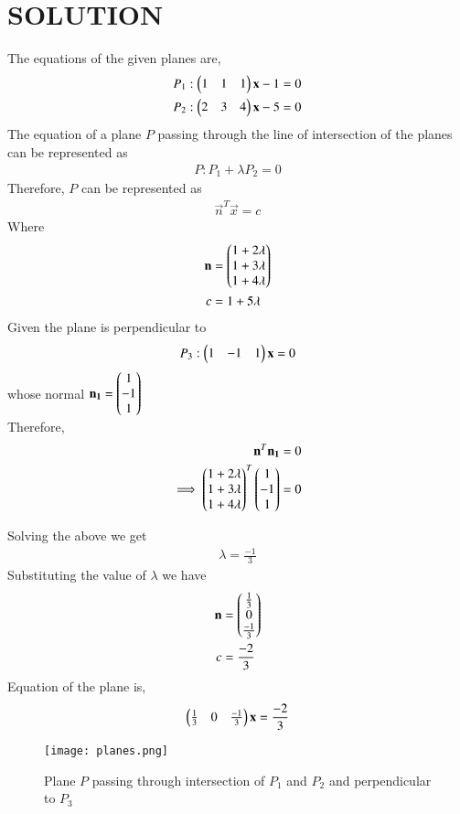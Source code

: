 \documentclass[journal,12pt,twocolumn]{IEEEtran}
\begin{document}
\section{SOLUTION}
The equations of the given planes are, 
\begin{align}
    P_{1} : \begin{pmatrix}1&1&1\end{pmatrix}\mathbf{x} - 1 = 0\\
    P_{2} : \begin{pmatrix}2&3&4\end{pmatrix}\mathbf{x} - 5 = 0
\end{align}
%
The equation of a plane $P$ passing through the line of intersection of the planes can be represented as
\begin{align}
   P : P_{1} + \lambda P_{2} = 0
\end{align}
%
Therefore, $P$ can be represented as
\begin{align}
    \vec{n}^T\vec{x}=c
\end{align}
Where
\begin{align}
    \mathbf{n}&=\begin{pmatrix}1+2\lambda\\1+3\lambda\\1+4\lambda\end{pmatrix}\\
    c&=1+5\lambda
\end{align}
Given the plane is perpendicular to
\begin{align}
    P_{3} : \begin{pmatrix}1&-1&1\end{pmatrix}\mathbf{x} = 0
\end{align}
whose normal $ \mathbf{n_{1}} = \begin{pmatrix}1\\-1\\1\end{pmatrix}$\\
Therefore,
\begin{align}
    \mathbf{n}^T\mathbf{n_{1}} = 0\\
    \implies \begin{pmatrix}1+2\lambda\\1+3\lambda\\1+4\lambda\end{pmatrix}^T\begin{pmatrix}1\\-1\\1\end{pmatrix} = 0
\end{align}

Solving the above we get
\begin{align}
    \lambda=\frac{-1}{3}
\end{align}
Substituting the value of $\lambda$ we have
\begin{align}
    \mathbf{n}&=\begin{pmatrix}\frac{1}{3}\\0\\\frac{-1}{3}\end{pmatrix}\\
    c&=\frac{-2}{3}
\end{align}
Equation of the plane is,
\begin{align}
    \begin{pmatrix}\frac{1}{3}&0&\frac{-1}{3}\end{pmatrix}\mathbf{x} = \frac{-2}{3} 
\end{align}
\begin{figure}[!ht]
\texttt{[image: planes.png]}
\caption{Plane $P$ passing through intersection of $P_{1}$ and $P_{2}$ and perpendicular to $P_{3}$}
\label{fig:Line }	
\end{figure}
\end{document}
